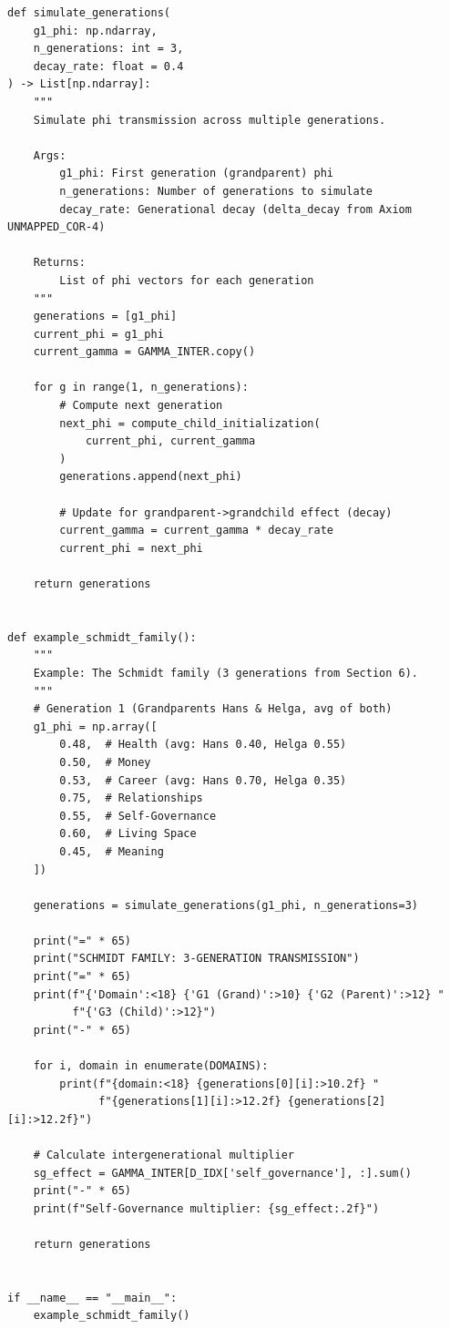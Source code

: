 \begin{verbatim}
def simulate_generations(
    g1_phi: np.ndarray,
    n_generations: int = 3,
    decay_rate: float = 0.4
) -> List[np.ndarray]:
    """
    Simulate phi transmission across multiple generations.

    Args:
        g1_phi: First generation (grandparent) phi
        n_generations: Number of generations to simulate
        decay_rate: Generational decay (delta_decay from Axiom UNMAPPED_COR-4)

    Returns:
        List of phi vectors for each generation
    """
    generations = [g1_phi]
    current_phi = g1_phi
    current_gamma = GAMMA_INTER.copy()

    for g in range(1, n_generations):
        # Compute next generation
        next_phi = compute_child_initialization(
            current_phi, current_gamma
        )
        generations.append(next_phi)

        # Update for grandparent->grandchild effect (decay)
        current_gamma = current_gamma * decay_rate
        current_phi = next_phi

    return generations


def example_schmidt_family():
    """
    Example: The Schmidt family (3 generations from Section 6).
    """
    # Generation 1 (Grandparents Hans & Helga, avg of both)
    g1_phi = np.array([
        0.48,  # Health (avg: Hans 0.40, Helga 0.55)
        0.50,  # Money
        0.53,  # Career (avg: Hans 0.70, Helga 0.35)
        0.75,  # Relationships
        0.55,  # Self-Governance
        0.60,  # Living Space
        0.45,  # Meaning
    ])

    generations = simulate_generations(g1_phi, n_generations=3)

    print("=" * 65)
    print("SCHMIDT FAMILY: 3-GENERATION TRANSMISSION")
    print("=" * 65)
    print(f"{'Domain':<18} {'G1 (Grand)':>10} {'G2 (Parent)':>12} "
          f"{'G3 (Child)':>12}")
    print("-" * 65)

    for i, domain in enumerate(DOMAINS):
        print(f"{domain:<18} {generations[0][i]:>10.2f} "
              f"{generations[1][i]:>12.2f} {generations[2][i]:>12.2f}")

    # Calculate intergenerational multiplier
    sg_effect = GAMMA_INTER[D_IDX['self_governance'], :].sum()
    print("-" * 65)
    print(f"Self-Governance multiplier: {sg_effect:.2f}")

    return generations


if __name__ == "__main__":
    example_schmidt_family()
\end{verbatim}

